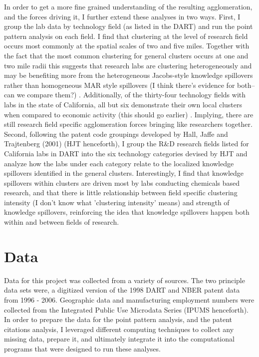 \documentclass[12pt,letterpaper]{article}
\begin{document}
\par 
In order to get a more fine grained understanding of the resulting agglomeration, and the forces driving it, I further extend these analyses in two ways. First, I group the lab data by technology field (as listed in the DART) and run the point pattern analysis on each field. I find that clustering at the level of research field occurs most commonly at the spatial scales of two and five miles. Together with the fact that the most common clustering for general clusters occurs at one and two mile radii this suggests that research labs are clustering heterogeneously and may be benefiting more from the heterogeneous Jacobs-style knowledge spillovers rather than homogeneous MAR style spillovers {\color{red}(I think there's evidence for both--can we compare them?)} . Additionally, of the thirty-four technology fields with labs in the state of California, all but six demonstrate their own local clusters when compared to economic activity {\color{red}(this should go earlier)} . Implying, there are still research field specific agglomeration forces bringing like researchers together. Second, following the patent code groupings developed by Hall, Jaffe and Trajtenberg (2001) (HJT henceforth), I group the R\&D research fields listed for California labs in DART into the six technology categories devised by HJT and analyze how the labs under each category relate to the localized knowledge spillovers identified in the general clusters. Interestingly, I find that knowledge spillovers within clusters are driven most by labs conducting chemicals based research, and that there is little relationship between field specific clustering intensity {\color{red}(I don't know what 'clustering intensity' means)}  and strength of knowledge spillovers, reinforcing the idea that knowledge spillovers happen both within and between fields of research.
 
\section{Data}
Data for this project was collected from a variety of sources. The two principle data sets were, a digitized version of the 1998 DART and NBER patent data from 1996 - 2006. Geographic data and manufacturing employment numbers were collected from the Integrated Public Use Microdata Series (IPUMS henceforth). In order to prepare the data for the point pattern analysis, and the patent citations analysis, I leveraged different computing techniques to collect any missing data, prepare it, and ultimately integrate it into the computational programs that were designed to run these analyses. 
\end{document}
